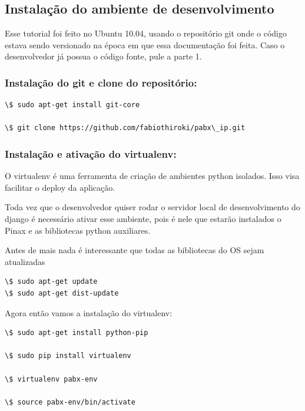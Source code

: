 \documentclass[letterpaper,10pt,brazil]{sphinxmanual}
\begin{document}
\subsection{Instalação do ambiente de desenvolvimento}
\label{inicio:instalacao-do-ambiente-de-desenvolvimento}
Esse tutorial foi feito no Ubuntu 10.04, usando o repositório git onde o código estava sendo versionado na época em que essa documentação foi feita. Caso o desenvolvedor já possua o código fonte, pule a parte 1.


\subsubsection{Instalação do git e clone do repositório:}
\label{inicio:instalacao-do-git-e-clone-do-repositorio}
\begin{Verbatim}[commandchars=\\\{\}]
\$ sudo apt-get install git-core

\$ git clone https://github.com/fabiothiroki/pabx\_ip.git
\end{Verbatim}


\subsubsection{Instalação e ativação do virtualenv:}
\label{inicio:instalacao-e-ativacao-do-virtualenv}
O virtualenv é uma ferramenta de criação de ambientes python isolados. Isso visa facilitar o deploy da aplicação.

Toda vez que o desenvolvedor quiser rodar o servidor local de desenvolvimento do django é necessário ativar esse ambiente, pois é nele que estarão instalados o Pinax e as bibliotecas python auxiliares.

Antes de mais nada é interessante que todas as bibliotecas do OS sejam atualizadas

\begin{Verbatim}[commandchars=\\\{\}]
\$ sudo apt-get update
\$ sudo apt-get dist-update
\end{Verbatim}

Agora então vamos a instalação do virtualenv:

\begin{Verbatim}[commandchars=\\\{\}]
\$ sudo apt-get install python-pip

\$ sudo pip install virtualenv

\$ virtualenv pabx-env

\$ source pabx-env/bin/activate
\end{Verbatim}
\end{document}
